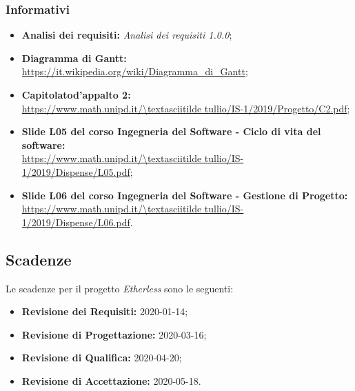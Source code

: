 \subsubsection{Informativi}
\begin{itemize}
	\item \textbf{Analisi dei requisiti:} \textit{Analisi dei requisiti 1.0.0}\docs;
	\item \textbf{Diagramma di Gantt\glos:} \url{https://it.wikipedia.org/wiki/Diagramma_di_Gantt};
    \item \textbf{Capitolato\glo d'appalto 2:}\\ 
			\url{https://www.math.unipd.it/\textasciitilde tullio/IS-1/2019/Progetto/C2.pdf};
	\item \textbf{Slide L05 del corso Ingegneria del Software - Ciclo di vita del software:} \\
			\url{https://www.math.unipd.it/\textasciitilde tullio/IS-1/2019/Dispense/L05.pdf};
	\item \textbf{Slide L06 del corso Ingegneria del Software - Gestione di Progetto:} \\
			\url{https://www.math.unipd.it/\textasciitilde tullio/IS-1/2019/Dispense/L06.pdf}.
\end{itemize}
\subsection{Scadenze}
Le scadenze per il progetto \textit{Etherless} sono le seguenti:
\begin{itemize}
	\item \textbf{Revisione dei Requisiti:} 2020-01-14;
	\item \textbf{Revisione di Progettazione:} 2020-03-16;
	\item \textbf{Revisione di Qualifica:} 2020-04-20;
	\item \textbf{Revisione di Accettazione:} 2020-05-18.
\end{itemize}